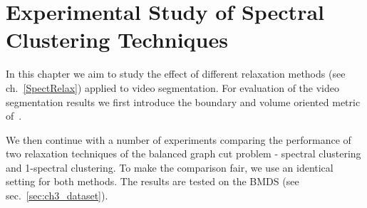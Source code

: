 \chapter{Experimental Study of Spectral Clustering Techniques}
\label{Chapter4}

In this chapter we aim to study the effect of different relaxation methods (see ch.~\ref{SpectRelax}) applied to video segmentation. 
For evaluation of the video segmentation results we first introduce the boundary and volume oriented metric of~\cite{Galasso13}.

We then continue with a number of experiments comparing the performance of two relaxation techniques of the balanced graph cut problem - spectral clustering and 1-spectral clustering.
To make the comparison fair, we use an identical setting for both methods. The results are tested on the BMDS (see sec.~\ref{sec:ch3_dataset}). 

